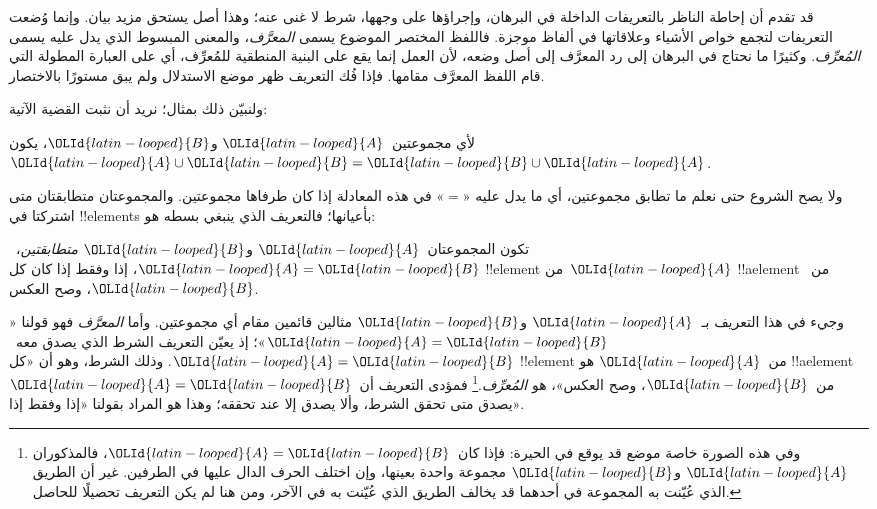 \documentclass[../../../include/open-logic-section]{subfiles}
\begin{document}


قد تقدم أن إحاطة الناظر بالتعريفات الداخلة في البرهان، وإجراؤها على
وجهها، شرط لا غنى عنه؛ وهذا أصل يستحق مزيد بيان. وإنما وُضعت
التعريفات لتجمع خواص الأشياء وعلاقاتها في ألفاظ موجزة. فاللفظ المختصر
الموضوع يسمى \emph{المعرَّف}، والمعنى المبسوط الذي يدل عليه يسمى
\emph{المُعرِّف}. وكثيرًا ما نحتاج في البرهان إلى رد المعرَّف إلى أصل
وضعه، لأن العمل إنما يقع على البنية المنطقية للمُعرِّف، أي على العبارة
المطولة التي قام اللفظ المعرَّف مقامها. فإذا فُك التعريف ظهر موضع
الاستدلال ولم يبق مستورًا بالاختصار.

ولنبيّن ذلك بمثال؛ نريد أن نثبت القضية الآتية:

\begin{prop}
لأي مجموعتين~${\OLId{latin-looped}{A}}$ و${\OLId{latin-looped}{B}}$، يكون~${\OLId{latin-looped}{A}} \cup {\OLId{latin-looped}{B}} = {\OLId{latin-looped}{B}} \cup {\OLId{latin-looped}{A}}$.
\end{prop}

ولا يصح الشروع حتى نعلم ما تطابق مجموعتين، أي ما يدل عليه «$=$» في
هذه المعادلة إذا كان طرفاها مجموعتين. والمجموعتان متطابقتان متى
اشتركتا في !!{element}s بأعيانها؛ فالتعريف الذي ينبغي بسطه هو:

\begin{defn}
تكون المجموعتان~${\OLId{latin-looped}{A}}$ و${\OLId{latin-looped}{B}}$ \emph{متطابقتين}،~${\OLId{latin-looped}{A}} = {\OLId{latin-looped}{B}}$، إذا وفقط إذا كان
كل !!{element} من~${\OLId{latin-looped}{A}}$ !!a{element} من~${\OLId{latin-looped}{B}}$، وصح العكس.
\end{defn}

وجيء في هذا التعريف بـ~${\OLId{latin-looped}{A}}$ و${\OLId{latin-looped}{B}}$ مثالين قائمين مقام أي مجموعتين. وأما
\emph{المعرَّف} فهو قولنا «${\OLId{latin-looped}{A}} = {\OLId{latin-looped}{B}}$»؛ إذ يعيّن التعريف الشرط الذي يصدق
معه~${\OLId{latin-looped}{A}} = {\OLId{latin-looped}{B}}$. وذلك الشرط، وهو أن «كل !!{element} من~${\OLId{latin-looped}{A}}$ هو
!!a{element} من~${\OLId{latin-looped}{B}}$، وصح العكس»، هو \emph{المُعرِّف}.\footnote{وفي
هذه الصورة خاصة موضع قد يوقع في الحيرة: فإذا كان~${\OLId{latin-looped}{A}} = {\OLId{latin-looped}{B}}$، فالمذكوران
${\OLId{latin-looped}{A}}$ و${\OLId{latin-looped}{B}}$ مجموعة واحدة بعينها، وإن اختلف الحرف الدال عليها في الطرفين.
غير أن الطريق الذي عُيّنت به المجموعة في أحدهما قد يخالف الطريق الذي
عُيّنت به في الآخر، ومن هنا لم يكن التعريف تحصيلًا للحاصل.} فمؤدى
التعريف أن~${\OLId{latin-looped}{A}} = {\OLId{latin-looped}{B}}$ يصدق متى تحقق الشرط، وألا يصدق إلا عند تحققه؛ وهذا
هو المراد بقولنا «إذا وفقط إذا».
\end{document}
